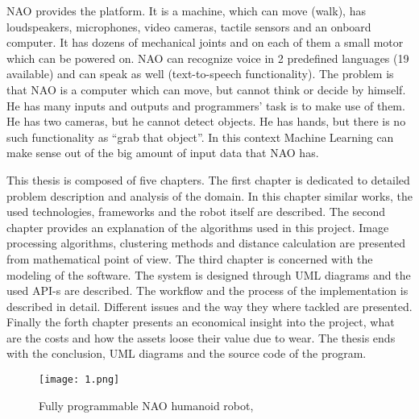 NAO provides the platform. It is a machine, which can move (walk), has loudspeakers, microphones, video cameras, tactile sensors and an onboard computer. It has dozens of mechanical joints and on each of them a small motor which can be powered on. NAO can recognize voice in 2 predefined languages (19 available) and can speak as well (text-to-speech functionality). The problem is that NAO is a computer which can move, but cannot think or decide by himself. He has many inputs and outputs and programmers' task is to make use of them. He has two cameras, but he cannot detect objects. He has hands, but there is no such functionality as ``grab that object''. In this context Machine Learning can make sense out of the big amount of input data that NAO has.

  This thesis is composed of five chapters. The first chapter is dedicated to detailed problem description and analysis of the domain. In this chapter similar works, the used technologies, frameworks and the robot itself are described. The second chapter provides an explanation of the algorithms used in this project. Image processing algorithms, clustering methods and distance calculation are presented from mathematical point of view. The third chapter is concerned with the modeling of the software. The system is designed through UML diagrams and the used API-s are described. The workflow and the process of the implementation is described in detail. Different issues and the way they where tackled are presented. Finally the forth chapter presents an economical insight into the project, what are the costs and how the assets loose their value due to wear. The thesis ends with the conclusion, UML diagrams and the source code of the program. 

\begin{figure}[!ht]
\renewcommand\thefigure{I.1} %
\centering
\texttt{[image: 1.png]}
\caption{Fully programmable NAO humanoid robot, \cite{naoPhoto1}}\label{naoRobot}
\end{figure}

\clearpage
